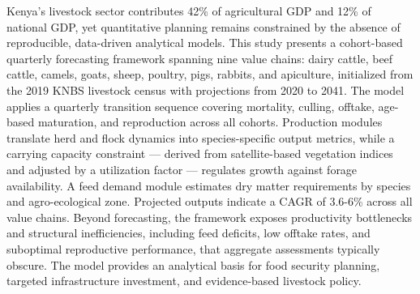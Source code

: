 
Kenya's livestock sector contributes 42\% of agricultural GDP and 12\% of national GDP, yet quantitative planning remains constrained by the absence of reproducible, data-driven analytical models. This study presents a cohort-based quarterly forecasting framework spanning nine value chains: dairy cattle, beef cattle, camels, goats, sheep, poultry, pigs, rabbits, and apiculture, initialized from the 2019 KNBS livestock census with projections from 2020 to 2041. The model applies a quarterly transition sequence covering mortality, culling, offtake, age-based maturation, and reproduction across all cohorts. Production modules translate herd and flock dynamics into species-specific output metrics, while a carrying capacity constraint — derived from satellite-based vegetation indices and adjusted by a utilization factor — regulates growth against forage availability. A feed demand module estimates dry matter requirements by species and agro-ecological zone. Projected outputs indicate a CAGR of 3.6-6\% across all value chains. Beyond forecasting, the framework exposes productivity bottlenecks and structural inefficiencies, including feed deficits, low offtake rates, and suboptimal reproductive performance, that aggregate assessments typically obscure. The model provides an analytical basis for food security planning, targeted infrastructure investment, and evidence-based livestock policy.